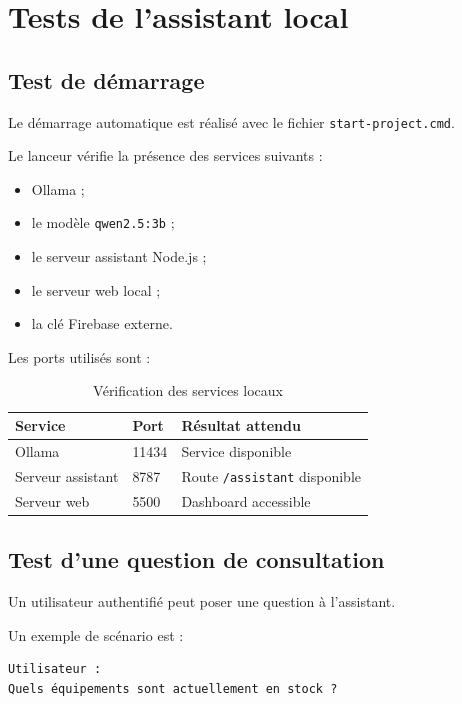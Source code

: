 \documentclass{rapportENSIAS}
\begin{document}
\section{Tests de l’assistant local}

\subsection{Test de démarrage}

Le démarrage automatique est réalisé avec le fichier \texttt{start-project.cmd}.

Le lanceur vérifie la présence des services suivants :

\begin{itemize}
    \item Ollama ;
    \item le modèle \texttt{qwen2.5:3b} ;
    \item le serveur assistant Node.js ;
    \item le serveur web local ;
    \item la clé Firebase externe.
\end{itemize}

Les ports utilisés sont :

\begin{table}[H]
    \centering
    \caption{Vérification des services locaux}
    \label{tab:services-locaux}
    \begin{tabular}{|p{5cm}|p{4cm}|p{4cm}|}
        \hline
        \textbf{Service} & \textbf{Port} & \textbf{Résultat attendu} \\
        \hline
        Ollama & 11434 & Service disponible \\
        \hline
        Serveur assistant & 8787 & Route \texttt{/assistant} disponible \\
        \hline
        Serveur web & 5500 & Dashboard accessible \\
        \hline
    \end{tabular}
\end{table}

\subsection{Test d’une question de consultation}

Un utilisateur authentifié peut poser une question à l’assistant.

Un exemple de scénario est :

\begin{verbatim}
Utilisateur :
Quels équipements sont actuellement en stock ?
\end{verbatim}
\end{document}
